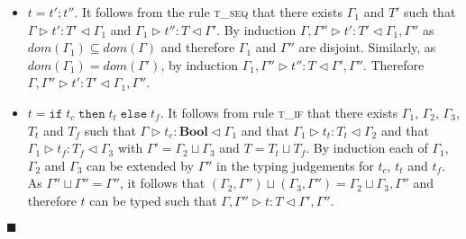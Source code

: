 \documentclass[preprint]{sigplanconf}
\newcommand{\tif}{\textsc{t\_if} }
\newcommand{\tseq}{\textsc{t\_seq} }
\newcommand{\typerule}[4]{#1 \triangleright #2 : #3 \triangleleft #4}
\newcommand{\boolt}{\mathbf{Bool}}
\newcommand{\ift}[3]{\mathtt{if} \; #1 \; \mathtt{then} \; #2 \; \mathtt{else} \; #3}
\newcommand{\qed}{$\blacksquare$}
\newenvironment{proof}{\vspace{1ex}\noindent{\bf Proof}\hspace{0.5em}}
  {\hfill\qed\vspace{1ex}}
\begin{document}
\begin{proof}
\begin{itemize}
\item $t = t' ; t''$. It follows from the rule \tseq that there exists
$\Gamma_1$ and $T'$ such that $\typerule{\Gamma}{t'}{T'}{\Gamma_1}$
and $\typerule{\Gamma_1}{t''}{T}{\Gamma'}$. By induction
$\typerule{\Gamma, \Gamma''}{t'}{T'}{\Gamma_1, \Gamma''}$
as $dom(\Gamma_1) \subseteq dom(\Gamma)$ and therefore
$\Gamma_1$ and $\Gamma''$ are disjoint.
Similarly, as $dom(\Gamma_1) = dom(\Gamma')$, by induction
$\typerule{\Gamma_1, \Gamma''}{t''}{T}{\Gamma', \Gamma''}$.
Therefore $\typerule{\Gamma, \Gamma''}{t'}{T'}{\Gamma_1, \Gamma''}$.

\item $t = \ift{t_c}{t_t}{t_f}$. It follows from rule \tif that there
exists $\Gamma_1$, $\Gamma_2$, $\Gamma_3$, $T_t$ and $T_f$ such that
$\typerule{\Gamma}{t_c}{\boolt}{\Gamma_1}$ and that
$\typerule{\Gamma_1}{t_t}{T_t}{\Gamma_2}$ and that
$\typerule{\Gamma_1}{t_f}{T_f}{\Gamma_3}$ with
$\Gamma' = \Gamma_2 \sqcup \Gamma_3$ and $T = T_t \sqcup T_f$.
By induction each of $\Gamma_1$, $\Gamma_2$ and $\Gamma_3$ can
be extended by $\Gamma''$ in the typing judgements for $t_c$,
$t_t$ and $t_f$. As $\Gamma'' \sqcup \Gamma'' = \Gamma''$, it
follows that $(\Gamma_2, \Gamma'') \sqcup (\Gamma_3, \Gamma'') = 
\Gamma_2 \sqcup \Gamma_3, \Gamma''$ and therefore $t$ can be
typed such that $\typerule{\Gamma, \Gamma''}{t}{T}{\Gamma', \Gamma''}$.

\end{itemize}

\end{proof}

\end{document}
